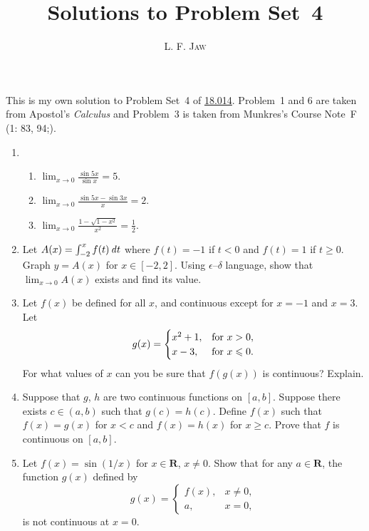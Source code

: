 \documentclass[a4paper]{article}
\title{Solutions to Problem Set~4}
\author{L. F. \textsc{Jaw}}
\begin{document}
\maketitle

This is my own solution to Problem Set~4 of
\href{https://ocw.mit.edu/courses/mathematics/18-014-calculus-with-theory-fall-2010/assignments/}{18.014}.
Problem~1 and 6 are taken from Apostol's \textit{Calculus} and Problem~3 is taken from Munkres's Course Note~F (1: 83, 94;).

\begin{enumerate}
\item
  \begin{enumerate}
    \everymath{\displaystyle}
  \item \(\lim_{x \to 0} \frac{\sin 5x}{\sin x} = 5\).
  \item \(\lim_{x \to 0} \frac{\sin 5x - \sin 3x}{x} = 2\).
  \item \(\lim_{x \to 0} \frac{1 - \sqrt{1-x^2}}{x^2} = \frac12\).
  \end{enumerate}

\item Let \(A(x) = \int_{-2}^x f(t) \mathop{}\!\mathit{d} t\) where \(f(t) = -1\) if
  \(t < 0\) and \(f(t) = 1\) if \(t \ge 0\).  Graph \(y = A(x)\) for
  \(x \in [-2,2]\).  Using \(\epsilon\)--\(\delta\) language, show that
  \(\lim_{x \to 0} A(x)\) exists and find its value.

\item Let \(f(x)\) be defined for all \(x\), and continuous except for
  \(x = -1\) and \(x = 3\).  Let
  \[
    g(x) =
    \begin{cases}
      x^2 + 1, & \tfor x > 0, \\
      x - 3, & \tfor x \le 0.
    \end{cases}
  \]
  For what values of \(x\) can you be sure that \(f(g(x))\) is continuous?
  Explain.

\item Suppose that \(g\), \(h\) are two continuous functions on \([a,b]\).
  Suppose there exists \(c \in (a,b)\) such that \(g(c) = h(c)\).  Define
  \(f(x)\) such that \(f(x) = g(x)\) for \(x < c\) and \(f(x) = h(x)\) for
  \(x \ge c\).  Prove that \(f\) is continuous on \([a,b]\).

\item Let \(f(x) = \sin(1/x)\) for \(x \in \mathbf{R}\), \(x \ne 0\).
  Show that for any \(a \in \mathbf{R}\), the function \(g(x)\) defined by
  \[
    g(x) =
    \begin{cases}
      f(x), & x \ne 0, \\
      a, & x = 0,
    \end{cases}
  \]
  is not continuous at \(x = 0\).


\end{enumerate}
\end{document}
